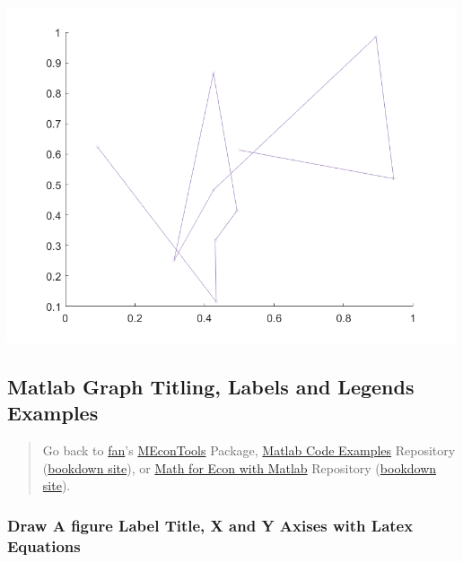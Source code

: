 \documentclass[
]{book}
\begin{document}
\includegraphics[width=5.20833in,height=\textheight]{img/fs_color_images/figure_12.png}

\hypertarget{matlab-graph-titling-labels-and-legends-examples}{%
\subsection{Matlab Graph Titling, Labels and Legends Examples}\label{matlab-graph-titling-labels-and-legends-examples}}

\begin{quote}
Go back to \href{http://fanwangecon.github.io/}{fan}'s \href{https://fanwangecon.github.io/MEconTools/}{MEconTools} Package, \href{https://fanwangecon.github.io/M4Econ/}{Matlab Code Examples} Repository (\href{https://fanwangecon.github.io/M4Econ/bookdown}{bookdown site}), or \href{https://fanwangecon.github.io/Math4Econ/}{Math for Econ with Matlab} Repository (\href{https://fanwangecon.github.io/Math4Econ/bookdown}{bookdown site}).
\end{quote}

\hypertarget{draw-a-figure-label-title-x-and-y-axises-with-latex-equations}{%
\subsubsection{\texorpdfstring{\textbf{Draw A figure Label Title, X and Y Axises with Latex Equations}}{Draw A figure Label Title, X and Y Axises with Latex Equations}}\label{draw-a-figure-label-title-x-and-y-axises-with-latex-equations}}
\end{document}

